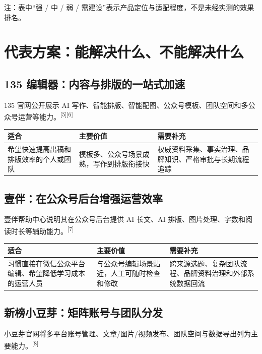 \documentclass[UTF8,11pt,a4paper,fontset=none]{ctexart}
\newcommand{\srcref}[1]{\textsuperscript{\textcolor{BrandBlue}{[#1]}}}
\begin{document}
\smallskip
{\small\color{Muted}注：表中“强 / 中 / 弱 / 需建设”表示产品定位与适配程度，不是未经实测的效果排名。}

\section{代表方案：能解决什么、不能解决什么}

\subsection{135 编辑器：内容与排版的一站式加速}

135 官网公开展示 AI 写作、智能排版、智能配图、公众号模板、团队空间和多公众号运营等能力。\srcref{5}\srcref{6}

\begin{tabularx}{\textwidth}{@{}L{30mm} Y Y@{}}
\toprule
\textbf{适合} & \textbf{主要价值} & \textbf{需要补充} \\
\midrule
希望快速提高出稿和排版效率的个人或团队 & 模板多、公众号场景成熟，写作到排版衔接快 & 权威资料采集、事实治理、品牌知识、严格审批与长期流程追踪 \\
\bottomrule
\end{tabularx}

\subsection{壹伴：在公众号后台增强运营效率}

壹伴帮助中心说明其在公众号后台提供 AI 长文、AI 排版、图片处理、字数和阅读时长等辅助能力。\srcref{7}

\begin{tabularx}{\textwidth}{@{}L{30mm} Y Y@{}}
\toprule
\textbf{适合} & \textbf{主要价值} & \textbf{需要补充} \\
\midrule
习惯直接在微信公众平台编辑、希望降低学习成本的运营人员 & 与公众号编辑场景贴近，人工可随时检查和修改 & 跨来源选题、复杂团队流程、品牌资料治理和外部系统数据回流 \\
\bottomrule
\end{tabularx}

\subsection{新榜小豆芽：矩阵账号与团队分发}

小豆芽官网将多平台账号管理、文章/图片/视频发布、团队空间与数据导出列为主要能力。\srcref{8}
\end{document}
